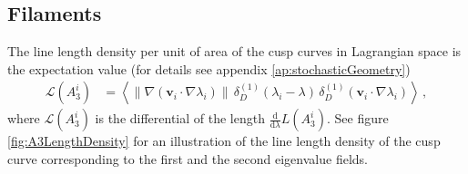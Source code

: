 \documentclass[a4paper, 11pt]{article}
\begin{document}
\subsection{Filaments}
The line length density per unit of area of the cusp curves in Lagrangian space is the expectation value (for details see appendix \ref{ap:stochasticGeometry})
\begin{align}
\mathcal{L}(A_3^i) 
&=  \left \langle \| \nabla (\bm{v}_i \cdot \nabla \lambda_i) \|\,
\delta_D^{(1)}(\lambda_i-\lambda)\,
\delta_D^{(1)}(\bm{v}_i \cdot \nabla \lambda_i) \right \rangle \,,
\end{align}
where $\mathcal{L}(A_3^i)$ is the differential of the length $\frac{\mathrm{d}}{\mathrm{d}\lambda} L(A_3^i)$.
See figure \ref{fig:A3LengthDensity} for an illustration of the line length density of the cusp curve corresponding to the first and the second eigenvalue fields.
\end{document}
